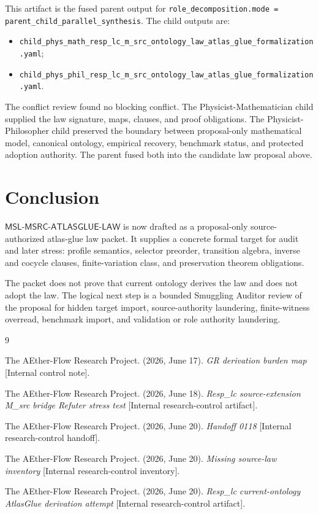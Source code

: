 \documentclass[11pt]{article}
\newcommand{\MSL}{\mathsf{MSL}\mbox{-}\mathsf{MSRC}\mbox{-}\mathsf{ATLASGLUE}\mbox{-}\mathsf{LAW}}
\begin{document}
This artifact is the fused parent output for
\texttt{role\_decomposition.mode = parent\_child\_parallel\_synthesis}. The
child outputs are:
\begin{itemize}
  \item \texttt{child\_phys\_math\_resp\_lc\_m\_src\_ontology\_law\_atlas\_glue\_formalization.yaml};
  \item \texttt{child\_phys\_phil\_resp\_lc\_m\_src\_ontology\_law\_atlas\_glue\_formalization.yaml}.
\end{itemize}
The conflict review found no blocking conflict. The Physicist-Mathematician
child supplied the law signature, maps, clauses, and proof obligations. The
Physicist-Philosopher child preserved the boundary between proposal-only
mathematical model, canonical ontology, empirical recovery, benchmark status,
and protected adoption authority. The parent fused both into the candidate
law proposal above.

\section{Conclusion}

\(\MSL\) is now drafted as a proposal-only source-authorized atlas-glue law
packet. It supplies a concrete formal target for audit and later stress:
profile semantics, selector preorder, transition algebra, inverse and cocycle
clauses, finite-variation class, and preservation theorem obligations.

The packet does not prove that current ontology derives the law and does not
adopt the law. The logical next step is a bounded Smuggling Auditor review of
the proposal for hidden target import, source-authority laundering,
finite-witness overread, benchmark import, and validation or role authority
laundering.

\begin{thebibliography}{9}

The AEther-Flow Research Project. (2026, June 17). \emph{GR derivation burden
map} [Internal control note].

The AEther-Flow Research Project. (2026, June 18). \emph{Resp\_lc
source-extension M\_src bridge Refuter stress test} [Internal research-control
artifact].

The AEther-Flow Research Project. (2026, June 20). \emph{Handoff 0118}
[Internal research-control handoff].

The AEther-Flow Research Project. (2026, June 20). \emph{Missing source-law
inventory} [Internal research-control inventory].

The AEther-Flow Research Project. (2026, June 20). \emph{Resp\_lc
current-ontology AtlasGlue derivation attempt} [Internal research-control
artifact].

\end{thebibliography}
\end{document}
